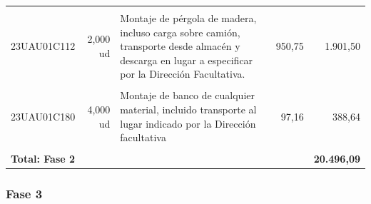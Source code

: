 \documentclass{book}%
\begin{document}
\begin{longtable}{lrlrr}
&&&&\\%
23UAU01C112&     2,000 ud&\multicolumn{1}{p{5cm}}{Montaje de pérgola de madera, incluso carga sobre camión, transporte desde almacén y descarga en lugar a especificar por la Dirección Facultativa.}&    950,75&1.901,50\\%
&&&&\\%
23UAU01C180&     4,000 ud&\multicolumn{1}{p{5cm}}{Montaje de banco de cualquier material, incluido transporte al lugar indicado por la Dirección facultativa}&     97,16&388,64\\%
&&&&\\%
\multicolumn{4}{p{8cm}}{\textbf{Total: Fase 2}}&\textbf{20.496,09}\\%
\end{longtable}%
\normalsize

%
\subsubsection{Fase 3}%
\small%
\end{document}

